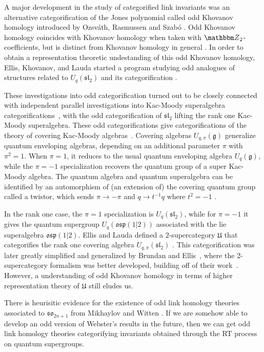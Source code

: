 \documentclass{amsart}
\theoremstyle{plain}
\theoremstyle{definition}
\theoremstyle{definition}
\numberwithin{equation}{section}
\numberwithin{theorem}{section}
\renewcommand{\to}{\rightarrow}
\def\mf{\mathfrak}
\numberwithin{equation}{section}
\def\Z{{\mathbbm Z}}
\begin{document}
A major development in the study of categorified link invariants was an alternative categorification of the Jones polynomial called odd Khovanov homology introduced by Ozsv\'ath, Rasmussen  and Szab\'o \cite{ORS}.
Odd Khovanov homology coincides with Khovanov homology when taken with $\Z_2$-coefficients, but is distinct from Khovanov homology in general \cite{Shum}.
In order to obtain a representation theoretic undestanding of this odd Khovanov homology, Ellis, Khovanov, and Lauda started a program studying odd analogues of structures related to $U_q(\mf{sl}_2)$ and its categorification \cite{EKL, EK,Lau-odd}.

These investigations into odd categorification turned out to be closely connected with independent parallel investigations into  Kac-Moody superalgebra categorifications~\cite{KKT, KKO, KKO2}, with the odd categorification of $\mf{sl}_2$ lifting the rank one Kac-Moody superalgebra.
These odd categorifications give categorifications of the theory of covering Kac-Moody algebras~\cite{HillWang,ClarkWang, CHW,CHW2}.
Covering algebras $U_{q,\pi}(\mf{g})$ generalize quantum enveloping algebras, depending on an additional parameter $\pi$ with $\pi^2 = 1$.  When $\pi=1$, it reduces to the usual quantum enveloping algebra $U_{q}(\mf{g})$, while the $\pi = -1$ specialization recovers the quantum group of a super Kac-Moody algebra.
The quantum algebra and quantum superalgebra can be identified by an automorphism of (an extension of) the covering quantum group called a twistor, which sends $\pi \to -\pi$ and $q\to t^{-1}q$ where $t^2=-1$ \cite{CFLW}.

In the rank one case, the $\pi=1$ specialization is $U_{q}(\mf{sl}_2)$, while for $\pi=-1$ it gives the quantum supergroup $U_{q}(\mf{osp}(1|2))$ associated with the lie superalgebra $\mf{osp}(1|2)$.
Ellis and Lauda defined a $2$-supercategory $\mf{U}$ that categorifies the rank one covering algebra $U_{q,\pi}(\mf{sl}_2)$ \cite{Lau-odd}.
This categorification was later greatly simplified and generalized by Brundan and Ellis~\cite{BE2}, where the 2-supercategory formalism was better developed, building off of their work~\cite{BE1}. 
However, a understanding of odd Khovanov homology in terms of higher representation theory of $\mf{U}$ still eludes us.

There is heurisitic evidence for the existence of odd link homology theories associated to $\mf{so}_{2n+1}$ from Mikhaylov and Witten \cite{Witten}.
If we are somehow able to develop an odd version of Webster's results in the future, then we can get odd link homology theories categorifying invariants obtained through the RT process on quantum supergroups.
\end{document}
